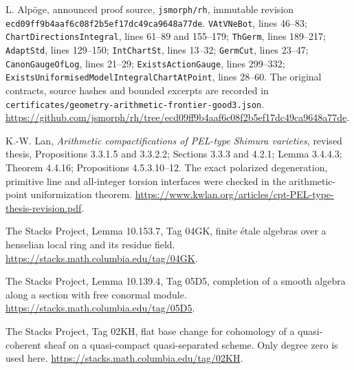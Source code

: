 L. Alp\"oge, announced proof source, \texttt{jsmorph/rh}, immutable
revision \texttt{ecd09ff9b4aaf6c08f2b5ef17dc49ca9648a77de}.
\texttt{VAtVNeBot}, lines 46--83;
\texttt{ChartDirectionsIntegral}, lines 61--89 and 155--179;
\texttt{ThGerm}, lines 189--217;
\texttt{AdaptStd}, lines 129--150;
\texttt{IntChartSt}, lines 13--32;
\texttt{GermCut}, lines 23--47;
\texttt{CanonGaugeOfLog}, lines 21--29;
\texttt{ExistsActionGauge}, lines 299--332;
\texttt{ExistsUniformisedModelIntegralChartAtPoint}, lines 28--60.
The original contracts, source hashes and bounded excerpts are
recorded in \texttt{certificates/geometry-arithmetic-frontier-good3.json}.
\url{https://github.com/jsmorph/rh/tree/ecd09ff9b4aaf6c08f2b5ef17dc49ca9648a77de}.

K.-W. Lan, \emph{Arithmetic compactifications of PEL-type Shimura
varieties}, revised thesis, Propositions 3.3.1.5 and 3.3.2.2;
Sections 3.3.3 and 4.2.1; Lemma 3.4.4.3; Theorem 4.4.16;
Propositions 4.5.3.10--12.
The exact polarized degeneration, primitive line and all-integer
torsion interfaces were checked in the arithmetic-point
uniformization theorem.
\url{https://www.kwlan.org/articles/cpt-PEL-type-thesis-revision.pdf}.

The Stacks Project, Lemma 10.153.7, Tag 04GK,
finite \'etale algebras over a henselian local ring and its residue
field. \url{https://stacks.math.columbia.edu/tag/04GK}.

The Stacks Project, Lemma 10.139.4, Tag 05D5,
completion of a smooth algebra along a section with free conormal
module. \url{https://stacks.math.columbia.edu/tag/05D5}.

The Stacks Project, Tag 02KH, flat base change for cohomology of a
quasi-coherent sheaf on a quasi-compact quasi-separated scheme.
Only degree zero is used here.
\url{https://stacks.math.columbia.edu/tag/02KH}.
